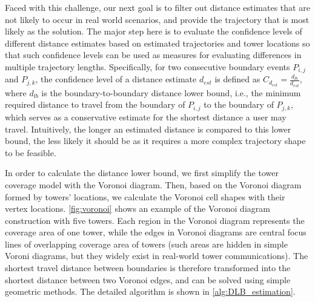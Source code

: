 Faced with this challenge, our next goal is to filter out distance estimates that are not likely to occur in real world scenarios, and provide the trajectory that is most likely as the solution. The major step here is to evaluate the confidence levels of different distance estimates based on estimated trajectories and tower locations so that such confidence levels can be used as measures for evaluating differences in multiple trajectory lengths. Specifically, for two consecutive boundary events $P_{i,j}$ and $P_{j,k}$, the confidence level of a distance estimate $d_{est}$ is defined as $C_{d_{est}} = \frac{d_{lb}}{d_{est}}$, where $d_{lb}$ is the boundary-to-boundary distance lower bound, i.e., the minimum required distance to travel from the boundary of $P_{i,j}$ to the boundary of $P_{j,k}$, which serves as a conservative estimate for the shortest distance a user may travel. Intuitively, the longer an estimated distance is compared to this lower bound, the less likely it should be as it requires a more complex trajectory shape to be feasible.


In order to calculate the distance lower bound,
we first simplify the tower coverage model with the Voronoi diagram.
Then, based on the Voronoi diagram formed by towers' locations, we calculate the Voronoi cell shapes with their vertex locations.
\autoref{fig:voronoi} shows an example of the Voronoi diagram construction with five towers.
Each region in the Voronoi diagram represents the coverage area of one tower, while the edges in Voronoi diagrams are central focus lines of overlapping coverage area of towers (such areas are hidden in simple Voroni diagrams, but they widely exist in real-world tower communications).
The shortest travel distance between boundaries is therefore transformed into the shortest distance between two Voronoi edges,
and can be solved using simple geometric methods. The detailed algorithm is shown in \autoref{alg:DLB_estimation}.


